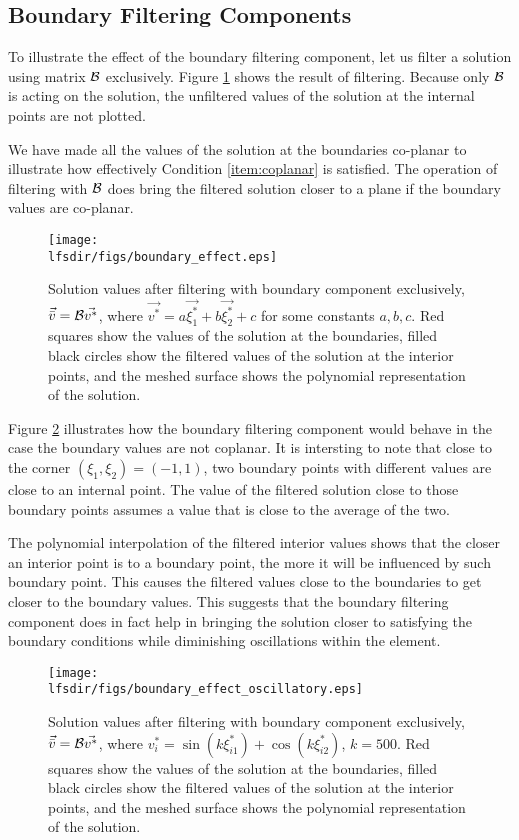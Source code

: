 \subsection{Boundary Filtering Components}
To illustrate the effect of the boundary filtering component, let us filter a solution using matrix $\mathcal{B}$ exclusively. Figure \ref{fig:boundary_effect} shows the result of filtering. Because only $\mathcal{B}$ is acting on the solution, the unfiltered values of the solution at the internal points are not plotted. 

We have made all the values of the solution at the boundaries co-planar to illustrate how effectively Condition \ref{item:coplanar} is satisfied. The operation of filtering with $\mathcal{B}$ does bring the filtered solution closer to a plane if the boundary values are co-planar.

\begin{figure}
\centering
\texttt{[image: \\lfsdir/figs/boundary\_effect.eps]}
\caption{Solution values after filtering with boundary component exclusively, $\vec{\bar{v}} = \mathcal{B}\vec{v^*}$, where  $\vec{v^*} = a\vec{\xi^*_1} + b\vec{\xi^*_2} + c$ for some constants $a,b,c$. Red squares show the values of the solution at the boundaries, filled black circles show the filtered values of the solution at the interior points, and the meshed surface shows the polynomial representation of the solution.} 
\label{fig:boundary_effect}
\end{figure}

Figure \ref{fig:boundary_effect_oscillatory} illustrates how the boundary filtering component would behave in the case the boundary values are not coplanar. It is intersting to note that close to the corner $(\xi_1,\xi_2) = (-1,1)$, two boundary points with different values are close to an internal point. The value  of the filtered solution close to those boundary points assumes a value that is close to the average of the two.

The polynomial interpolation of the filtered interior values shows that the closer an interior point is to a boundary point, the more it will be influenced by such boundary point. This causes the filtered values close to the boundaries to get closer to the boundary values. This suggests that the boundary filtering component does in fact help in bringing the solution closer to satisfying the boundary conditions while diminishing oscillations within the element.

\begin{figure}
\centering
\texttt{[image: \\lfsdir/figs/boundary\_effect\_oscillatory.eps]}
\caption{Solution values after filtering with boundary component exclusively, $\vec{\bar{v}} = \mathcal{B}\vec{v^*}$, where   ${v_i^*} = \sin{(k\xi^*_{i1})} + \cos{(k\xi^*_{i2})} $, $k=500$. Red squares show the values of the solution at the boundaries, filled black circles show the filtered values of the solution at the interior points, and the meshed surface shows the polynomial representation of the solution.} 
\label{fig:boundary_effect_oscillatory}
\end{figure}

